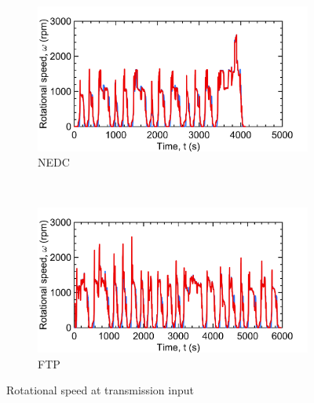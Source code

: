 \begin{figure}[ht]
  \centering
  \begin{subfigure}[b]{0.45\textwidth}
    \includegraphics[width=\textwidth]{figures/model/NEDC_plt_w_trans_in.png}
    \caption{NEDC}
    \label{fig:NEDC_w_trans_in}
  \end{subfigure}
  ~ %
  \begin{subfigure}[b]{0.45\textwidth}
    \includegraphics[width=\textwidth]{figures/model/FTP_plt_w_trans_in.png}
    \caption{FTP}
    \label{fig:FTP_w_trans_in}
  \end{subfigure}
  \caption{Rotational speed at transmission input}\label{fig:w_trans_in}
\end{figure}

